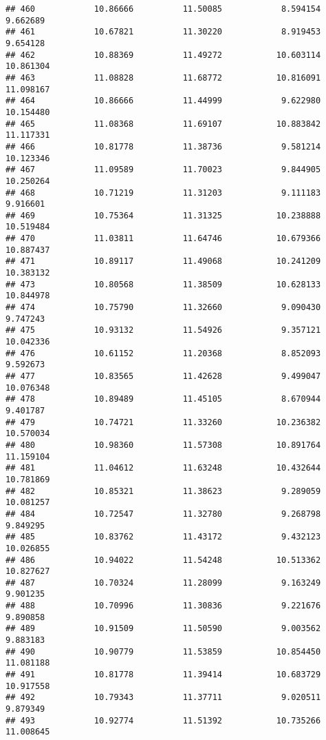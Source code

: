 \documentclass[
]{article}
\begin{document}
\begin{verbatim}
## 460            10.86666          11.50085            8.594154          9.662689
## 461            10.67821          11.30220            8.919453          9.654128
## 462            10.88369          11.49272           10.603114         10.861304
## 463            11.08828          11.68772           10.816091         11.098167
## 464            10.86666          11.44999            9.622980         10.154480
## 465            11.08368          11.69107           10.883842         11.117331
## 466            10.81778          11.38736            9.581214         10.123346
## 467            11.09589          11.70023            9.844905         10.250264
## 468            10.71219          11.31203            9.111183          9.916601
## 469            10.75364          11.31325           10.238888         10.519484
## 470            11.03811          11.64746           10.679366         10.887437
## 471            10.89117          11.49068           10.241209         10.383132
## 473            10.80568          11.38509           10.628133         10.844978
## 474            10.75790          11.32660            9.090430          9.747243
## 475            10.93132          11.54926            9.357121         10.042336
## 476            10.61152          11.20368            8.852093          9.592673
## 477            10.83565          11.42628            9.499047         10.076348
## 478            10.89489          11.45105            8.670944          9.401787
## 479            10.74721          11.33260           10.236382         10.570034
## 480            10.98360          11.57308           10.891764         11.159104
## 481            11.04612          11.63248           10.432644         10.781869
## 482            10.85321          11.38623            9.289059         10.081257
## 484            10.72547          11.32780            9.268798          9.849295
## 485            10.83762          11.43172            9.432123         10.026855
## 486            10.94022          11.54248           10.513362         10.827627
## 487            10.70324          11.28099            9.163249          9.901235
## 488            10.70996          11.30836            9.221676          9.890858
## 489            10.91509          11.50590            9.003562          9.883183
## 490            10.90779          11.53859           10.854450         11.081188
## 491            10.81778          11.39414           10.683729         10.917558
## 492            10.79343          11.37711            9.020511          9.879349
## 493            10.92774          11.51392           10.735266         11.008645

\end{verbatim}
\end{document}
